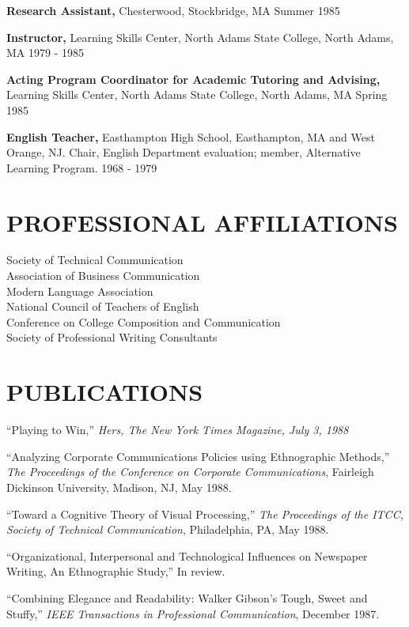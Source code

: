 \begin{resume}
    {\bf Research Assistant,} Chesterwood, Stockbridge, MA  Summer 1985 
 
    {\bf Instructor,} Learning Skills Center, North Adams State 
    College, North Adams, MA  1979 - 1985 
 
    {\bf Acting Program Coordinator for Academic Tutoring and 
    Advising,} Learning Skills Center, North Adams State College, 
    North Adams, MA  Spring 1985 
 
    {\bf English Teacher,} Easthampton High School, Easthampton, MA and 
    West Orange, NJ.  Chair, English Department evaluation; 
    member, Alternative Learning Program.  1968 - 1979 
 
 
\section{PROFESSIONAL AFFILIATIONS} 
\vspace{0.1in} 
    Society of Technical Communication \\
    Association of Business Communication \\
    Modern Language Association \\
    National Council of Teachers of English \\
    Conference on College Composition and Communication \\
    Society of Professional Writing Consultants 

\section{PUBLICATIONS} 
\vspace{0.1in}
``Playing to Win,'' {\it Hers, The New York Times Magazine, July 3, 1988} 

 
``Analyzing Corporate Communications Policies using Ethnographic 
Methods,'' {\it The Proceedings of the Conference on Corporate 
Communications}, Fairleigh Dickinson University, Madison, NJ, May 
1988. 
 
``Toward a Cognitive Theory of Visual Processing,'' {\it The Proceedings 
of the ITCC, Society of Technical Communication}, Philadelphia, 
PA, May 1988. 
 
``Organizational, Interpersonal and Technological Influences on 
Newspaper Writing, An Ethnographic Study,'' In review. 
 
``Combining Elegance and Readability: Walker Gibson's Tough, Sweet 
and Stuffy,'' {\it IEEE Transactions in Professional Communication}, 
December 1987. 
 

\end{resume}
